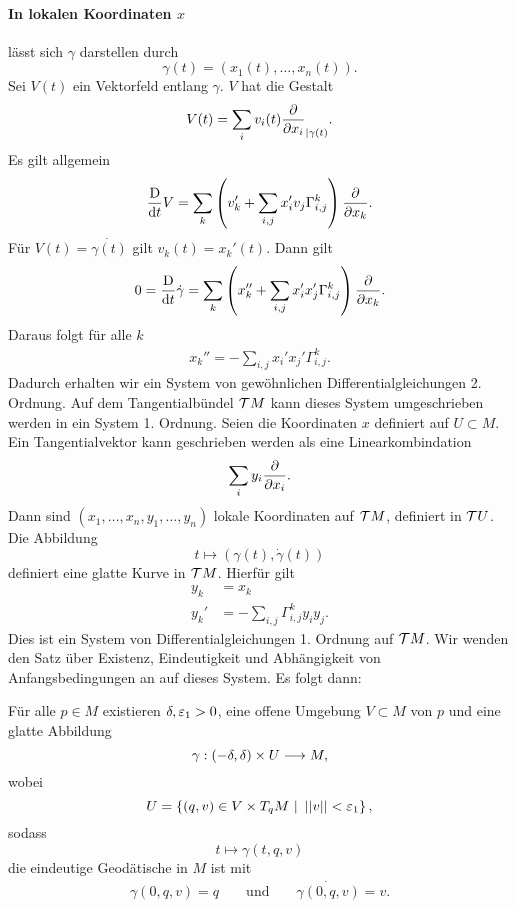 \paragraph{In lokalen Koordinaten $x$} lässt sich $\gamma$ darstellen durch
\[ \gamma(t) = (x_1(t), \ldots, x_n (t)) .\]
Sei $V(t)$ ein Vektorfeld entlang $\gamma$. $V$ hat die Gestalt
\[ V(t) = \sum_i v_i(t) \frac{\partial }{\partial x_i}_{|\gamma(t)}. \]
Es gilt allgemein
\begin{align*}
\frac{\text{D}}{\text{d} t}V = \sum_k \left(
v_k' + \sum_{i,j} x_i' v_j \Gamma_{i,j}^k
\right)
\frac{\partial }{\partial x_k}.
\end{align*}
Für $V(t) = \dot{\gamma(t)}$ gilt $v_k(t) = x_k'(t)$. Dann gilt
\begin{align*}
0 = \frac{\text{D}}{\text{d} t}\dot{\gamma} = \sum_k \left(
	x_k'' + \sum_{i,j} x_i' x_j' \Gamma_{i,j}^k
\right)
\frac{\partial }{\partial x_k}.
\end{align*}
Daraus folgt für alle $k$
\begin{align*}
	x_k'' = - \sum_{i,j} x_i' x_j' \Gamma_{i,j}^k.
\end{align*}
Dadurch erhalten wir ein System von gewöhnlichen Differentialgleichungen 2. Ordnung. Auf dem Tangentialbündel $\mathcal{T} M$ kann dieses System umgeschrieben werden in ein System 1. Ordnung. Seien die Koordinaten $x$ definiert auf $U \subset M$. Ein Tangentialvektor kann geschrieben werden als eine Linearkombindation
\[ \sum_i y_i \frac{\partial }{\partial x_i}. \]
Dann sind $(x_1, \ldots, x_n, y_1, \ldots, y_n)$ lokale Koordinaten auf $\mathcal{T} M$, definiert in $\mathcal{T} U$.\\
Die Abbildung
\[ t \longmapsto (\gamma(t), \dot{\gamma}(t)) \]
definiert eine glatte Kurve in $\mathcal{T} M$. Hierfür gilt
\begin{align*}
y_k &= x_k\\
y_k' &= - \sum_{i,j} \Gamma_{i,j}^ky_iy_j.
\end{align*}
Dies ist ein System von Differentialgleichungen 1. Ordnung auf $\mathcal{T} M$. Wir wenden den Satz über Existenz, Eindeutigkeit und Abhängigkeit von Anfangsbedingungen an auf dieses System. Es folgt dann:

\Prop{}
Für alle $p \in M$ existieren $\delta, \varepsilon_1 > 0$, eine offene Umgebung $V \subset M$ von $p$ und eine glatte Abbildung
\[ \gamma : (-\delta, \delta) \times U \overset{}{\longrightarrow} M, \]
wobei
\[ U = \set{(q,v) \in V \times T_qM}{\norm{v} < \e_1}, \] 
sodass
\[ t \longmapsto \gamma(t,q,v) \]
die eindeutige Geodätische in $M$ ist mit
\begin{align*}
\gamma(0,q,v) = q && \text{ und } && \dot{\gamma(0,q,v)} = v.
\end{align*}

